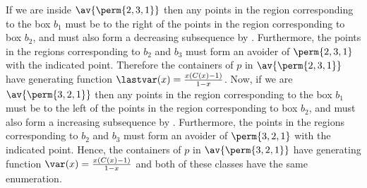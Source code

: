 If we are inside \(\av{\perm{2,3,1}}\) then any points in the region corresponding
to the box \(b_1\) must be to the right of the points in the region corresponding to
box \(b_2\), and must also form a decreasing subsequence by .
Furthermore, the points in the regions corresponding to \(b_2\) and
\(b_3\) must form an avoider of \(\perm{2,3,1}\) with the indicated point.
Therefore the containers of \(p\) in \(\av{\perm{2,3,1}}\) have generating function
\(\lastvar(x) = \frac{x(C(x)-1)}{1-x}\).
Now, if we are \(\av{\perm{3,2,1}}\) then any points in the region corresponding
to the box \(b_1\) must be to the left of the points in the region corresponding to
box \(b_2\), and must also form a increasing subsequence by .
Furthermore, the points in the regions corresponding to \(b_2\) and
\(b_3\) must form an avoider of \(\perm{3,2,1}\) with the indicated point.
Hence, the containers of \(p\) in \(\av{\perm{3,2,1}}\) have generating function
\(\var(x) = \frac{x(C(x)-1)}{1-x}\) and both of these classes have the same
enumeration.
